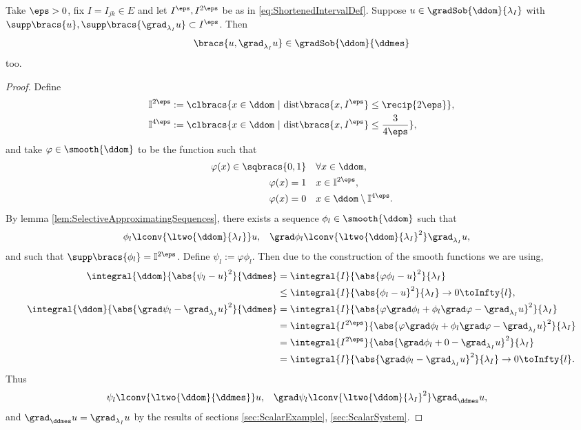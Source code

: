 \begin{lemma} \label{lem:ExtensionLemmaAllGradients}
	Take $\eps>0$, fix $I=I_{jk}\in E$ and let $I^\eps, I^{2\eps}$ be as in \eqref{eq:ShortenedIntervalDef}.
	Suppose $u\in\gradSob{\ddom}{\lambda_I}$ with $\supp\bracs{u},\supp\bracs{\grad_{\lambda_I}u} \subset I^\eps$.
	Then
	\begin{align*}
		\bracs{u, \grad_{\lambda_I}u}\in\gradSob{\ddom}{\ddmes}
	\end{align*}
	too.
\end{lemma}
\begin{proof}
	Define 
	\begin{align*}
		\mathbb{I}^{2\eps} &:= \clbracs{x\in\ddom \ \vert \ \mathrm{dist}\bracs{x,I^\eps}\leq \recip{2\eps}}, \\
		\mathbb{I}^{4\eps} &:= \clbracs{x\in\ddom \ \vert \ \mathrm{dist}\bracs{x,I^\eps}\leq \frac{3}{4\eps}},
	\end{align*}
	and take $\varphi\in\smooth{\ddom}$ to be the function such that
	\begin{align*}
		\varphi(x)\in\sqbracs{0,1} &\quad \forall x\in\ddom, \\
		\varphi(x) = 1 &\quad x\in \mathbb{I}^{2\eps}, \\
		\varphi(x) = 0 &\quad x\in \ddom\setminus\mathbb{I}^{4\eps}.
	\end{align*}
	By lemma \ref{lem:SelectiveApproximatingSequences}, there exists a sequence $\phi_l\in\smooth{\ddom}$ such that
	\begin{align*}
		\phi_l \lconv{\ltwo{\ddom}{\lambda_I}} u, 
		&\quad \grad\phi_l \lconv{\ltwo{\ddom}{\lambda_I}^2} \grad_{\lambda_I} u,
	\end{align*}
	and such that $\supp\bracs{\phi_l} = \mathbb{I}^{2\eps}$.
	Define $\psi_l := \varphi\phi_l$.
	Then due to the construction of the smooth functions we are using,
	\begin{align*}
		\integral{\ddom}{\abs{ \psi_l - u }^2}{\ddmes}
		&= \integral{I}{\abs{ \varphi\phi_l - u }^2}{\lambda_I} \\
		&\leq \integral{I}{\abs{ \phi_l - u }^2}{\lambda_I} \rightarrow0 \toInfty{l}, \\
		\integral{\ddom}{\abs{ \grad\psi_l - \grad_{\lambda_I}u }^2}{\ddmes}
		&= \integral{I}{\abs{ \varphi\grad\phi_l + \phi_l\grad\varphi - \grad_{\lambda_I}u }^2}{\lambda_I} \\
		&= \integral{I^{2\eps}}{\abs{ \varphi\grad\phi_l + \phi_l\grad\varphi - \grad_{\lambda_I}u }^2}{\lambda_I} \\
		&= \integral{I^{2\eps}}{\abs{ \grad\phi_l + 0 - \grad_{\lambda_I}u }^2}{\lambda_I} \\
		&= \integral{I}{\abs{ \grad\phi_l - \grad_{\lambda_I}u }^2}{\lambda_I} \rightarrow0 \toInfty{l}.
	\end{align*}
	Thus
	\begin{align*}
		\psi_l \lconv{\ltwo{\ddom}{\ddmes}} u, 
		&\quad \grad\psi_l \lconv{\ltwo{\ddom}{\lambda_I}^2} \grad_{\ddmes} u,
	\end{align*}
	and $\grad_{\ddmes}u = \grad_{\lambda_I}u$ by the results of sections \ref{sec:ScalarExample}, \ref{sec:ScalarSystem}.
\end{proof}

